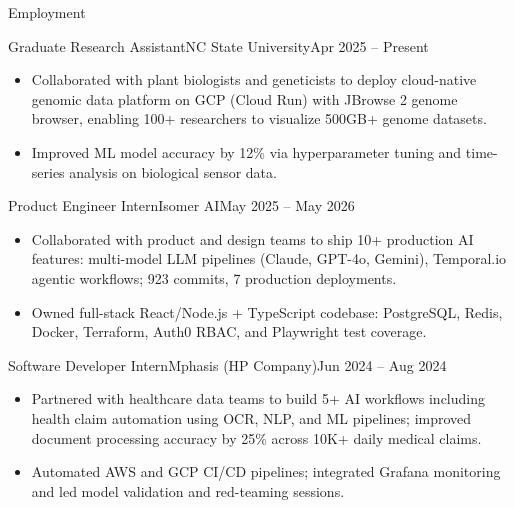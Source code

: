 \documentclass[]{mcdowellcv}
\begin{document}
\makeheader

\begin{cvsection}{Employment}
  \begin{cvsubsection}{Graduate Research Assistant}{NC State University}{Apr 2025 -- Present}
    \begin{itemize}
      \item Collaborated with plant biologists and geneticists to deploy cloud-native genomic data platform on GCP (Cloud Run) with JBrowse 2 genome browser, enabling 100+ researchers to visualize 500GB+ genome datasets.
      \item Improved ML model accuracy by 12\% via hyperparameter tuning and time-series analysis on biological sensor data.
    \end{itemize}
    \vspace{-1.5pt}
  \end{cvsubsection}

  \begin{cvsubsection}{Product Engineer Intern}{Isomer AI}{May 2025 -- May 2026}
    \begin{itemize}
      \item Collaborated with product and design teams to ship 10+ production AI features: multi-model LLM pipelines (Claude, GPT-4o, Gemini), Temporal.io agentic workflows; 923 commits, 7 production deployments.
      \item Owned full-stack React/Node.js + TypeScript codebase: PostgreSQL, Redis, Docker, Terraform, Auth0 RBAC, and Playwright test coverage.
    \end{itemize}
    \vspace{-1.5pt}
  \end{cvsubsection}

  \begin{cvsubsection}{Software Developer Intern}{Mphasis (HP Company)}{Jun 2024 -- Aug 2024}
    \begin{itemize}
      \item Partnered with healthcare data teams to build 5+ AI workflows including health claim automation using OCR, NLP, and ML pipelines; improved document processing accuracy by 25\% across 10K+ daily medical claims.
      \item Automated AWS and GCP CI/CD pipelines; integrated Grafana monitoring and led model validation and red-teaming sessions.
    \end{itemize}
    \vspace{-1.5pt}
  \end{cvsubsection}


\end{cvsection}
\end{document}
